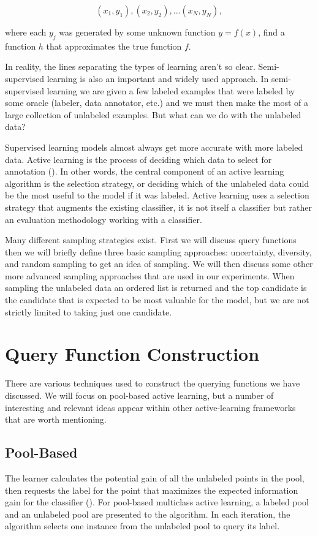 \[(x_1, y_1), (x_2,y_2),... (x_N,y_N),\]

where each $y_j$ was generated by some unknown function $y=f(x)$, find a function $h$ that approximates the true function $f$.

In reality, the lines separating the types of learning aren't so clear. Semi-supervised learning is also an important and widely used approach. In semi-supervised learning we are given a few labeled examples that were labeled by some oracle (labeler, data annotator, etc.) and we must then make the most of a large collection of unlabeled examples. But what can we do with the unlabeled data? 

Supervised learning models almost always get more accurate with more labeled data. Active learning is the process of deciding which data to select for annotation (\cite{munro2021human}). In other words, the central component of an active learning algorithm is the selection strategy, or deciding which of the unlabeled data could be the most useful to the model if it was labeled. Active learning uses a selection strategy that augments the existing classifier, it is not itself a classifier but rather an evaluation methodology working with a classifier.

Many different sampling strategies exist. First we will discuss query functions then we will briefly define three basic sampling approaches: uncertainty, diversity, and random sampling to get an idea of sampling. We will then discuss some other more advanced sampling approaches that are used in our experiments. When sampling the unlabeled data an ordered list is returned and the top candidate is the candidate that is expected to be most valuable for the model, but we are not strictly limited to taking just one candidate.

\section{Query Function Construction}
There are various techniques used to construct the querying functions we have discussed. We will focus on pool-based active learning, but a number of interesting and relevant ideas appear within other active-learning frameworks that are worth mentioning.

\subsection{Pool-Based}
The learner calculates the potential gain of all the unlabeled points in the pool, then requests the label for the point that maximizes the expected information gain for the classifier (\cite{huang2016alce}). For pool-based multiclass active learning, a labeled pool and an unlabeled pool are presented to the algorithm. In each iteration, the algorithm selects one instance from the unlabeled pool to query its label.

